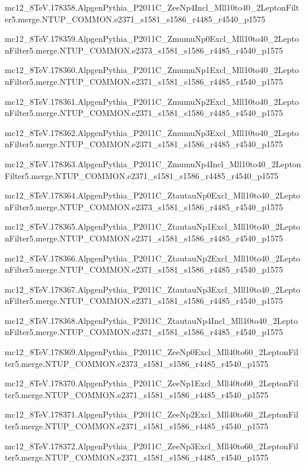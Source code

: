 mc12\_8TeV.178358.AlpgenPythia\_P2011C\_ZeeNp4Incl\_Mll10to40\_2LeptonFilter5.merge.NTUP\_COMMON.e2371\_s1581\_s1586\_r4485\_r4540\_p1575

mc12\_8TeV.178359.AlpgenPythia\_P2011C\_ZmumuNp0Excl\_Mll10to40\_2LeptonFilter5.merge.NTUP\_COMMON.e2373\_s1581\_s1586\_r4485\_r4540\_p1575

mc12\_8TeV.178360.AlpgenPythia\_P2011C\_ZmumuNp1Excl\_Mll10to40\_2LeptonFilter5.merge.NTUP\_COMMON.e2371\_s1581\_s1586\_r4485\_r4540\_p1575

mc12\_8TeV.178361.AlpgenPythia\_P2011C\_ZmumuNp2Excl\_Mll10to40\_2LeptonFilter5.merge.NTUP\_COMMON.e2371\_s1581\_s1586\_r4485\_r4540\_p1575

mc12\_8TeV.178362.AlpgenPythia\_P2011C\_ZmumuNp3Excl\_Mll10to40\_2LeptonFilter5.merge.NTUP\_COMMON.e2371\_s1581\_s1586\_r4485\_r4540\_p1575

mc12\_8TeV.178363.AlpgenPythia\_P2011C\_ZmumuNp4Incl\_Mll10to40\_2LeptonFilter5.merge.NTUP\_COMMON.e2371\_s1581\_s1586\_r4485\_r4540\_p1575

mc12\_8TeV.178364.AlpgenPythia\_P2011C\_ZtautauNp0Excl\_Mll10to40\_2LeptonFilter5.merge.NTUP\_COMMON.e2373\_s1581\_s1586\_r4485\_r4540\_p1575

mc12\_8TeV.178365.AlpgenPythia\_P2011C\_ZtautauNp1Excl\_Mll10to40\_2LeptonFilter5.merge.NTUP\_COMMON.e2371\_s1581\_s1586\_r4485\_r4540\_p1575

mc12\_8TeV.178366.AlpgenPythia\_P2011C\_ZtautauNp2Excl\_Mll10to40\_2LeptonFilter5.merge.NTUP\_COMMON.e2371\_s1581\_s1586\_r4485\_r4540\_p1575

mc12\_8TeV.178367.AlpgenPythia\_P2011C\_ZtautauNp3Excl\_Mll10to40\_2LeptonFilter5.merge.NTUP\_COMMON.e2371\_s1581\_s1586\_r4485\_r4540\_p1575

mc12\_8TeV.178368.AlpgenPythia\_P2011C\_ZtautauNp4Incl\_Mll10to40\_2LeptonFilter5.merge.NTUP\_COMMON.e2371\_s1581\_s1586\_r4485\_r4540\_p1575

mc12\_8TeV.178369.AlpgenPythia\_P2011C\_ZeeNp0Excl\_Mll40to60\_2LeptonFilter5.merge.NTUP\_COMMON.e2373\_s1581\_s1586\_r4485\_r4540\_p1575

mc12\_8TeV.178370.AlpgenPythia\_P2011C\_ZeeNp1Excl\_Mll40to60\_2LeptonFilter5.merge.NTUP\_COMMON.e2371\_s1581\_s1586\_r4485\_r4540\_p1575

mc12\_8TeV.178371.AlpgenPythia\_P2011C\_ZeeNp2Excl\_Mll40to60\_2LeptonFilter5.merge.NTUP\_COMMON.e2371\_s1581\_s1586\_r4485\_r4540\_p1575

mc12\_8TeV.178372.AlpgenPythia\_P2011C\_ZeeNp3Excl\_Mll40to60\_2LeptonFilter5.merge.NTUP\_COMMON.e2371\_s1581\_s1586\_r4485\_r4540\_p1575

